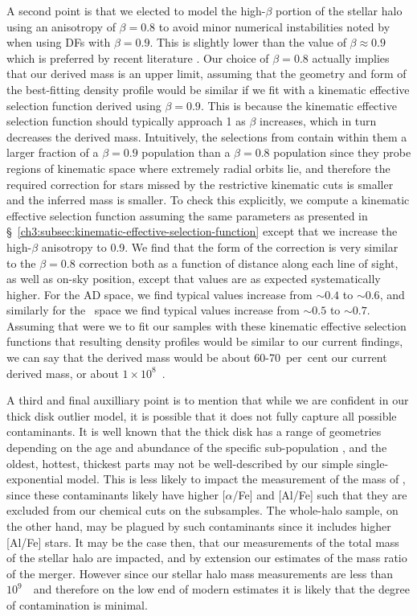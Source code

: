 A second point is that we elected to model the high-$\beta$ portion of the stellar halo using an anisotropy of $\beta=0.8$ to avoid minor numerical instabilities noted by \cite{lane22} when using DFs with $\beta=0.9$. This is slightly lower than the value of $\beta \approx 0.9$ which is preferred by recent literature \parencite{belokurov18,fattahi19,lancaster19,iorio21}. Our choice of $\beta=0.8$ actually implies that our derived mass is an upper limit, assuming that the geometry and form of the best-fitting \gse density profile would be similar if we fit with a kinematic effective selection function derived using $\beta=0.9$. This is because the kinematic effective selection function should typically approach 1 as $\beta$ increases, which in turn decreases the derived mass. Intuitively, the selections from \cite{lane22} contain within them a larger fraction of a $\beta=0.9$ population than a $\beta=0.8$ population since they probe regions of kinematic space where extremely radial orbits lie, and therefore the required correction for stars missed by the restrictive kinematic cuts is smaller and the inferred mass is smaller. To check this explicitly, we compute a kinematic effective selection function assuming the same parameters as presented in \S~\ref{ch3:subsec:kinematic-effective-selection-function} except that we increase the high-$\beta$ anisotropy to 0.9. We find that the form of the correction is very similar to the $\beta=0.8$ correction both as a function of distance along each line of sight, as well as on-sky position, except that values are as expected systematically higher. For the AD space, we find typical values increase from $\sim 0.4$ to $\sim 0.6$, and similarly for the \eLz\ space we find typical values increase from $\sim 0.5$ to $\sim 0.7$. Assuming that were we to fit our samples with these kinematic effective selection functions that resulting density profiles would be similar to our current findings, we can say that the derived mass would be about 60-70~per~cent our current derived mass, or about $1\times10^{8}$~\Msun.

A third and final auxilliary point is to mention that while we are confident in our thick disk outlier model, it is possible that it does not fully capture all possible contaminants. It is well known that the thick disk has a range of geometries depending on the age and abundance of the specific sub-population \parencite{bovy12d,mackereth19b}, and the oldest, hottest, thickest parts may not be well-described by our simple single-exponential model. This is less likely to impact the measurement of the mass of \gse, since these contaminants likely have higher [$\alpha$/Fe] and [Al/Fe] such that they are excluded from our chemical cuts on the \gse subsamples. The whole-halo sample, on the other hand, may be plagued by such contaminants since it includes higher [Al/Fe] stars. It may be the case then, that our measurements of the total mass of the stellar halo are impacted, and by extension our estimates of the mass ratio of the \gse merger. However since our stellar halo mass measurements are less than $10^{9}$~\Msun\ and therefore on the low end of modern estimates \parencite[e.g.][]{deason19,mackereth20} it is likely that the degree of contamination is minimal.

